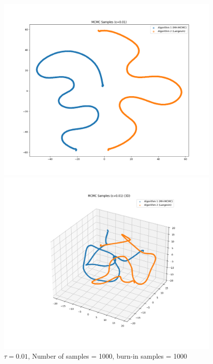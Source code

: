 \documentclass[a4paper,12pt]{article}
\begin{document}
\begin{figure}[H]
  \centering
  \begin{minipage}{0.48\textwidth}
    \includegraphics[width=\linewidth]{TASK-0-1/images/samples_eps0.01_n1000_burn1000_tsne_2d.png}
  \end{minipage}
  \hfill
  \begin{minipage}{0.48\textwidth}
    \includegraphics[width=\linewidth]{TASK-0-1/images/samples_eps0.01_n1000_burn1000_tsne_3d.png}
  \end{minipage}
  \caption{$\tau = 0.01$, Number of samples = 1000, burn-in samples = 1000}
\end{figure}
\end{document}
